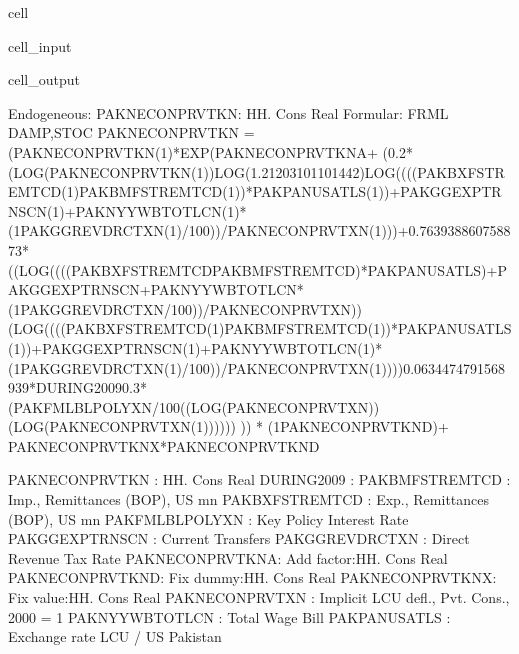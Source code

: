 \documentclass[letterpaper,10pt,english]{jupyterBook}
\begin{document}
\begin{sphinxuseclass}{cell}\begin{sphinxVerbatimInput}

\begin{sphinxuseclass}{cell_input}
\begin{sphinxVerbatim}[commandchars=\\\{\}]
\end{sphinxVerbatim}

\end{sphinxuseclass}\end{sphinxVerbatimInput}
\begin{sphinxVerbatimOutput}

\begin{sphinxuseclass}{cell_output}
\begin{sphinxVerbatim}[commandchars=\\\{\}]
Endogeneous: PAKNECONPRVTKN: HH. Cons Real
Formular: FRML \PYGZlt{}DAMP,STOC\PYGZgt{} PAKNECONPRVTKN = (PAKNECONPRVTKN(\PYGZhy{}1)*EXP(PAKNECONPRVTKN\PYGZus{}A+ (\PYGZhy{}0.2*(LOG(PAKNECONPRVTKN(\PYGZhy{}1))\PYGZhy{}LOG(1.21203101101442)\PYGZhy{}LOG((((PAKBXFSTREMTCD(\PYGZhy{}1)\PYGZhy{}PAKBMFSTREMTCD(\PYGZhy{}1))*PAKPANUSATLS(\PYGZhy{}1))+PAKGGEXPTRNSCN(\PYGZhy{}1)+PAKNYYWBTOTLCN(\PYGZhy{}1)*(1\PYGZhy{}PAKGGREVDRCTXN(\PYGZhy{}1)/100))/PAKNECONPRVTXN(\PYGZhy{}1)))+0.763938860758873*((LOG((((PAKBXFSTREMTCD\PYGZhy{}PAKBMFSTREMTCD)*PAKPANUSATLS)+PAKGGEXPTRNSCN+PAKNYYWBTOTLCN*(1\PYGZhy{}PAKGGREVDRCTXN/100))/PAKNECONPRVTXN))\PYGZhy{}(LOG((((PAKBXFSTREMTCD(\PYGZhy{}1)\PYGZhy{}PAKBMFSTREMTCD(\PYGZhy{}1))*PAKPANUSATLS(\PYGZhy{}1))+PAKGGEXPTRNSCN(\PYGZhy{}1)+PAKNYYWBTOTLCN(\PYGZhy{}1)*(1\PYGZhy{}PAKGGREVDRCTXN(\PYGZhy{}1)/100))/PAKNECONPRVTXN(\PYGZhy{}1))))\PYGZhy{}0.0634474791568939*DURING\PYGZus{}2009\PYGZhy{}0.3*(PAKFMLBLPOLYXN/100\PYGZhy{}((LOG(PAKNECONPRVTXN))\PYGZhy{}(LOG(PAKNECONPRVTXN(\PYGZhy{}1)))))) )) * (1\PYGZhy{}PAKNECONPRVTKN\PYGZus{}D)+ PAKNECONPRVTKN\PYGZus{}X*PAKNECONPRVTKN\PYGZus{}D  \PYGZdl{}

PAKNECONPRVTKN  : HH. Cons Real
DURING\PYGZus{}2009     : 
PAKBMFSTREMTCD  : Imp., Remittances (BOP), US\PYGZdl{} mn
PAKBXFSTREMTCD  : Exp., Remittances (BOP), US\PYGZdl{} mn
PAKFMLBLPOLYXN  : Key Policy Interest Rate
PAKGGEXPTRNSCN  : Current Transfers
PAKGGREVDRCTXN  : Direct Revenue Tax Rate
PAKNECONPRVTKN\PYGZus{}A: Add factor:HH. Cons Real
PAKNECONPRVTKN\PYGZus{}D: Fix dummy:HH. Cons Real
PAKNECONPRVTKN\PYGZus{}X: Fix value:HH. Cons Real
PAKNECONPRVTXN  : Implicit LCU defl., Pvt. Cons., 2000 = 1
PAKNYYWBTOTLCN  : Total Wage Bill
PAKPANUSATLS    : Exchange rate LCU / US\PYGZdl{} \PYGZhy{} Pakistan
\end{sphinxVerbatim}

\end{sphinxuseclass}\end{sphinxVerbatimOutput}

\end{sphinxuseclass}
\end{document}
